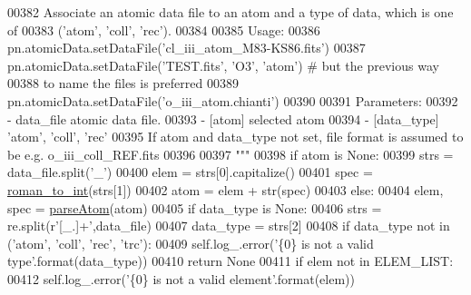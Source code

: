 \begin{DoxyCode}
00382 \textcolor{stringliteral}{        Associate an atomic data file to an atom and a type of data, which is one of }
00383 \textcolor{stringliteral}{            ('atom', 'coll', 'rec').}
00384 \textcolor{stringliteral}{}
00385 \textcolor{stringliteral}{        Usage:}
00386 \textcolor{stringliteral}{            pn.atomicData.setDataFile('cl\_iii\_atom\_M83-KS86.fits')}
00387 \textcolor{stringliteral}{            pn.atomicData.setDataFile('TEST.fits', 'O3', 'atom') # but the previous way }
00388 \textcolor{stringliteral}{                to name the files is preferred}
00389 \textcolor{stringliteral}{            pn.atomicData.setDataFile('o\_iii\_atom.chianti')}
00390 \textcolor{stringliteral}{}
00391 \textcolor{stringliteral}{        Parameters:}
00392 \textcolor{stringliteral}{            - data\_file    atomic data file. }
00393 \textcolor{stringliteral}{            - [atom]         selected atom}
00394 \textcolor{stringliteral}{            - [data\_type]    'atom', 'coll', 'rec'}
00395 \textcolor{stringliteral}{            If atom and data\_type not set, file format is assumed to be e.g. o\_iii\_coll\_REF.fits}
00396 \textcolor{stringliteral}{}
00397 \textcolor{stringliteral}{        """}          
00398         \textcolor{keywordflow}{if} atom \textcolor{keywordflow}{is} \textcolor{keywordtype}{None}:
00399             strs = data\_file.split(\textcolor{stringliteral}{'\_'})
00400             elem = strs[0].capitalize()
00401             spec = \hyperlink{namespacepyneb_1_1utils_1_1misc_a97329c3ce57bd870421672b90e3e6541}{roman\_to\_int}(strs[1])
00402             atom = elem + str(spec)
00403         \textcolor{keywordflow}{else}:
00404             elem, spec = \hyperlink{namespacepyneb_1_1utils_1_1misc_a8c069186002a3e73dd474958e35034d5}{parseAtom}(atom)
00405         \textcolor{keywordflow}{if} data\_type \textcolor{keywordflow}{is} \textcolor{keywordtype}{None}:
00406             strs = re.split(\textcolor{stringliteral}{r'[\_.]+'},data\_file)
00407             data\_type = strs[2]
00408         \textcolor{keywordflow}{if} data\_type \textcolor{keywordflow}{not} \textcolor{keywordflow}{in} (\textcolor{stringliteral}{'atom'}, \textcolor{stringliteral}{'coll'}, \textcolor{stringliteral}{'rec'}, \textcolor{stringliteral}{'trc'}):
00409             self.log\_.error(\textcolor{stringliteral}{'\{0\} is not a valid type'}.format(data\_type))
00410             \textcolor{keywordflow}{return} \textcolor{keywordtype}{None}
00411         \textcolor{keywordflow}{if} elem \textcolor{keywordflow}{not} \textcolor{keywordflow}{in} ELEM\_LIST:
00412             self.log\_.error(\textcolor{stringliteral}{'\{0\} is not a valid element'}.format(elem))

\end{DoxyCode}
